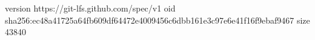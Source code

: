 version https://git-lfs.github.com/spec/v1
oid sha256:ec48a41725a64fb609df64472e4009456c6dbb161e3c97e6e41f16f9ebaf9467
size 43840

